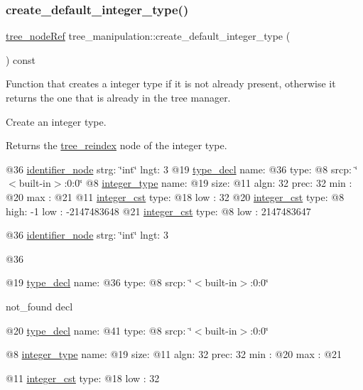\subsubsection{\texorpdfstring{create\+\_\+default\+\_\+integer\+\_\+type()}{create\_default\_integer\_type()}}
{\footnotesize\ttfamily \hyperlink{tree__node_8hpp_a6ee377554d1c4871ad66a337eaa67fd5}{tree\+\_\+node\+Ref} tree\+\_\+manipulation\+::create\+\_\+default\+\_\+integer\+\_\+type (\begin{DoxyParamCaption}{ }\end{DoxyParamCaption}) const}



Function that creates a integer type if it is not already present, otherwise it returns the one that is already in the tree manager. 

Create an integer type.

\begin{DoxyReturn}{Returns}
the \hyperlink{classtree__reindex}{tree\+\_\+reindex} node of the integer type. 
\end{DoxyReturn}
@36 \hyperlink{structidentifier__node}{identifier\+\_\+node} strg\+: \char`\"{}int\char`\"{} lngt\+: 3 @19 \hyperlink{structtype__decl}{type\+\_\+decl} name\+: @36 type\+: @8 srcp\+: \char`\"{}$<$built-\/in$>$\+:0\+:0\char`\"{} @8 \hyperlink{structinteger__type}{integer\+\_\+type} name\+: @19 size\+: @11 algn\+: 32 prec\+: 32 min \+: @20 max \+: @21 @11 \hyperlink{structinteger__cst}{integer\+\_\+cst} type\+: @18 low \+: 32 @20 \hyperlink{structinteger__cst}{integer\+\_\+cst} type\+: @8 high\+: -\/1 low \+: -\/2147483648 @21 \hyperlink{structinteger__cst}{integer\+\_\+cst} type\+: @8 low \+: 2147483647

@36 \hyperlink{structidentifier__node}{identifier\+\_\+node} strg\+: \char`\"{}int\char`\"{} lngt\+: 3

@36

@19 \hyperlink{structtype__decl}{type\+\_\+decl} name\+: @36 type\+: @8 srcp\+: \char`\"{}$<$built-\/in$>$\+:0\+:0\char`\"{}

not\+\_\+found decl

@20 \hyperlink{structtype__decl}{type\+\_\+decl} name\+: @41 type\+: @8 srcp\+: \char`\"{}$<$built-\/in$>$\+:0\+:0\char`\"{}

@8 \hyperlink{structinteger__type}{integer\+\_\+type} name\+: @19 size\+: @11 algn\+: 32 prec\+: 32 min \+: @20 max \+: @21

@11 \hyperlink{structinteger__cst}{integer\+\_\+cst} type\+: @18 low \+: 32

